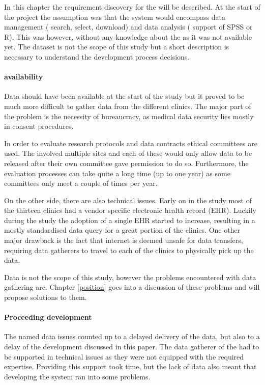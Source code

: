 In this chapter the requirement discovery for the \ivfsystem{} will be described.
At the start of the project the assumption was that the system would encompass data management (\eg{} search, select, download) and data analysis (\eg{} support of SPSS or R).
This was however, without any knowledge about the \projectdata{} as it was not available yet.
The dataset is not the scope of this study but a short description is necessary to understand the development process decisions.

\paragraph{\projectdata{} availability}
Data should have been available at the start of the study but it proved to be much more difficult to gather data from the different clinics.
The major part of the problem is the necessity of bureaucracy, as medical data security lies mostly in consent procedures.

In order to evaluate research protocols and data contracts ethical committees are used.
The \project{} involved multiple sites and each of these would only allow data to be released after their own committee gave permission to do so.
Furthermore, the evaluation processes can take quite a long time (up to one year) as some committees only meet a couple of times per year.

On the other side, there are also technical issues.
Early on in the study most of the thirteen clinics had a vendor specific electronic health record (EHR).
Luckily during the study the adoption of a single EHR started to increase, resulting in a mostly standardised data query for a great portion of the clinics.
One other major drawback is the fact that internet is deemed unsafe for data transfers, requiring data gatherers to travel to each of the clinics to physically pick up the data.

Data is not the scope of this study, however the problems encountered with data gathering are.
Chapter \ref{position} goes into a discussion of these problems and will propose solutions to them.

\paragraph{Proceeding development}
The named data issues counted up to a delayed delivery of the data, but also to a delay of the development discussed in this paper.
The data gatherer of the \project{} had to be supported in technical issues as they were not equipped with the required expertise.
Providing this support took time, but the lack of data also meant that developing the system ran into some problems.

